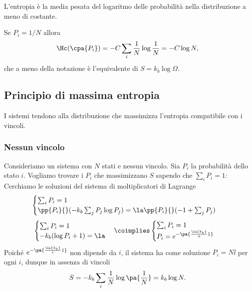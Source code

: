 \begin{remark}
L'entropia \`e la media pesata del logaritmo delle probabilit\`a nella distribuzione a meno di costante.
\end{remark}

\begin{remark}
Se $P_i=1/N$ allora \[\Hc(\cpa{P_i})=-C\sum_i \frac1N\log\frac1N=-C\log N,\]
che a meno della notazione \`e l'equivalente di $S=k_b\log \Omega$.
\end{remark}


\subsection{Principio di massima entropia}
\begin{fact}
I sistemi tendono alla distribuzione che massimizza l'entropia compatibile con i vincoli.
\end{fact}

\subsubsection{Nessun vincolo}
Consideriamo un sistema con $N$ stati e nessun vincolo. Sia $P_i$ la probabilit\`a dello stato $i$. Vogliamo trovare i $P_i$ che massimizzano $S$ sapendo che $\sum_i P_i=1$:\\
Cerchiamo le soluzioni del sistema di moltiplicatori di Lagrange
\[\begin{cases}
\sum_i P_i=1\\
\pp{P_i}{}(-k_b\sum_j P_j\log P_j)=\la \pp{P_i}{}(-1+\sum_j P_j)
\end{cases}\]
\[\begin{cases}
\sum_i P_i=1\\
-k_b (\log P_i+1)=\la
\end{cases}\coimplies\begin{cases}
\sum_i P_i=1\\
P_i=e^{-\pa{\frac \la{k_b}+1}}
\end{cases}\]
Poich\'e $e^{-\pa{\frac \la{k_b}+1}}$ non dipende da $i$, il sistema ha come soluzione $P_i=N\ii$ per ogni $i$, dunque in assenza di vincoli
\[S=-k_b\sum_i\frac1N\log\pa{\frac1N}=k_b\log N.\]

